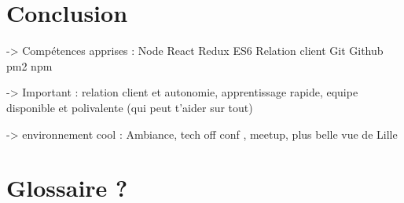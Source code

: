 \newpage

\section{Conclusion}\label{conclusion-2}

-\textgreater{} Compétences apprises : Node React Redux ES6 Relation
client Git Github pm2 npm

-\textgreater{} Important : relation client et autonomie, apprentissage
rapide, equipe disponible et polivalente (qui peut t'aider sur tout)

-\textgreater{} environnement cool : Ambiance, tech off conf , meetup,
plus belle vue de Lille

\newpage

\section{Glossaire ?}\label{glossaire}
